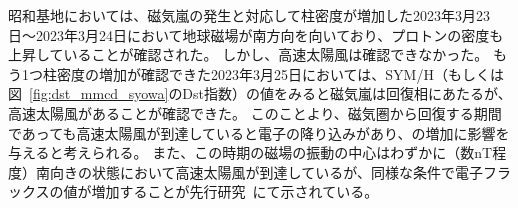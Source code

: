 昭和基地においては、磁気嵐の発生と対応して柱密度が増加した2023年3月23日〜2023年3月24日において地球磁場が南方向を向いており、プロトンの密度も上昇していることが確認された。
しかし、高速太陽風は確認できなかった。
もう1つ柱密度の増加が確認できた2023年3月25日においては、SYM/H（もしくは図~\ref{fig:dst_mmcd_syowa}のDst指数）の値をみると磁気嵐は回復相にあたるが、高速太陽風があることが確認できた。
このことより、磁気圏から回復する期間であっても高速太陽風が到達していると電子の降り込みがあり、の増加に影響を与えると考えられる。
また、この時期の磁場の振動の中心はわずかに（数nT程度）南向きの状態において高速太陽風が到達しているが、同様な条件で電子フラックスの値が増加することが先行研究~\cite{miyoshi2013high}にて示されている。
